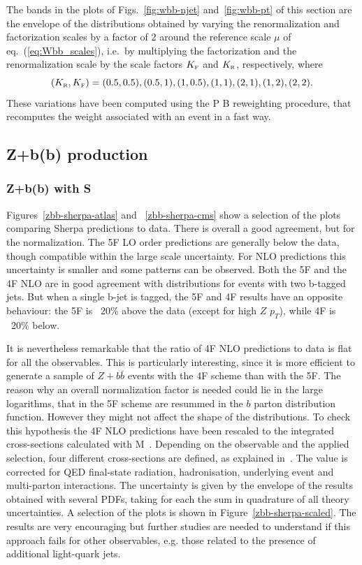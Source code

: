 \documentclass[11pt]{cernrep}
\newcommand{\Sherpa}{S\protect\scalebox{0.8}{HERPA}\xspace}
\newcommand{\pt}{\ensuremath{p_{T}}\xspace}
\newcommand\KRA{K_{\scriptscriptstyle \rm R}}
\newcommand\KFA{K_{\scriptscriptstyle \rm F}}
\newcommand{\POWHEGBOX}{P\protect\scalebox{0.8}{OWHEG} B\protect\scalebox{0.8}{OX}\xspace}
\newcommand{\MCFM}{M\protect\scalebox{0.8}{CFM}\xspace}
\begin{document}
\begin{enumerate}
The bands in the plots of Figs.~\ref{fig:wbb-njet}
and~\ref{fig:wbb-pt} of this section are the envelope of the
distributions obtained by varying the renormalization and factorization
scales by a factor of 2 around the reference scale $\mu$ of
eq.~(\ref{eq:Wbb_scales}), i.e.~by multiplying the factorization and the
renormalization scale by the scale factors $\KFA$ and $\KRA$, respectively,
where
\begin{equation}
\label{eq:KRA_KFA}
(\KRA,\KFA)=(0.5,0.5),  (0.5,1), (1,0.5), (1,1),(2,1),(1,2),(2,2).
\end{equation}
These variations have been computed using the \POWHEGBOX{} reweighting
procedure, that recomputes the weight associated with an event in a fast way.
\end{enumerate}

\subsection{Z+b(b) production \label{Zbb}}

\subsubsection*{Z+b(b) with \Sherpa}

Figures~\ref{zbb-sherpa-atlas} and ~\ref{zbb-sherpa-cms} show a selection of
the plots comparing Sherpa predictions to data.  There is overall a good
agreement, but for the normalization. The 5F LO order predictions are
generally below the data, though compatible within the large scale
uncertainty. For NLO predictions this uncertainty is smaller and some
patterns can be observed. Both the 5F and the 4F NLO are in good agreement
with distributions for events with two b-tagged jets.  But when a single
b-jet is tagged, the 5F and 4F results have an opposite behaviour: the 5F is
~20\% above the data (except for high $Z$ \pt), while 4F is ~20\% below.

It is nevertheless remarkable that the ratio of 4F NLO predictions to data is
flat for all the observables. This is particularly interesting, since it is
more efficient to generate a sample of $Z+b\bar{b}$ events with the 4F scheme
than with the 5F. The reason why an overall normalization factor is needed
could lie in the large logarithms, that in the 5F scheme are resummed in the
$b$ parton distribution function. However they might not affect the shape of
the distributions. To check this hypothesis the 4F NLO predictions have been
rescaled to the integrated cross-sections calculated with
\MCFM~\cite{Campbell:2010ff}. Depending on the observable and the applied
selection, four different cross-sections are defined, as explained
in~\cite{Aad:2014dvb}. The value is corrected for QED final-state
radiation, hadronisation, underlying event and multi-parton
interactions. The uncertainty is given by the envelope of
the results obtained with several PDFs, taking for each the sum in quadrature of all theory uncertainties.
A selection of the plots is shown in
Figure~\ref{zbb-sherpa-scaled}. The results are very encouraging but further
studies are needed to understand if this approach fails for other
observables, e.g. those related to the presence of additional light-quark
jets.
\end{document}
